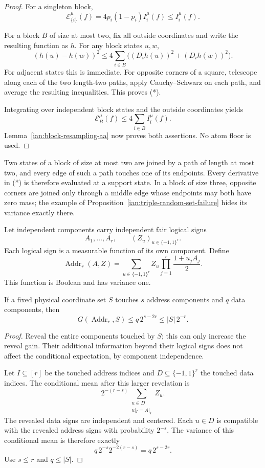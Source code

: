 \begin{proof}
For a singleton block,
\[
 \mathcal E_{\{i\}}^\mu(f)
 =4p_i(1-p_i)I_i^\mu(f)\le I_i^\mu(f).
\]

For a block \(B\) of size at most two, fix all outside coordinates
and write the resulting function as \(h\). For any block states
\(u,w\),
\[
 (h(u)-h(w))^2
 \le4\sum_{i\in B}
       \bigl((D_ih(u))^2+(D_ih(w))^2\bigr).
 \tag{*}
\]
For adjacent states this is immediate. For opposite corners of a
square, telescope along each of the two length-two paths, apply
Cauchy--Schwarz on each path, and average the resulting inequalities.
This proves (*).

Integrating over independent block states and the outside coordinates
yields
\[
 \mathcal E_B^\mu(f)\le4\sum_{i\in B}I_i^\mu(f).
\]
Lemma~\ref{ian:block-resampling-aa} now proves both assertions.
No atom floor is used.
\end{proof}

\begin{remark}
\label{ian:two-versus-three}
Two states of a block of size at most two are joined by a path of length at most two, and every edge of such a path touches one of its endpoints. Every derivative in (*) is therefore evaluated at a support state. In a block of size three, opposite corners are joined only through a middle edge whose endpoints may both have zero mass; the example of Proposition~\ref{ian:triple-random-set-failure} hides its variance exactly there.
\end{remark}

\begin{lemma}
\label{ian:addressing-reveal}
Let independent components carry independent fair logical signs
\[
 A_1,\ldots,A_r,\qquad (Z_u)_{u\in\{-1,1\}^r}.
\]
Each logical sign is a measurable function of its own component.
Define
\[
 \operatorname{Addr}_r(A,Z)
 =\sum_{u\in\{-1,1\}^r}
       Z_u\prod_{j=1}^r\frac{1+u_jA_j}{2}.
\]
This function is Boolean and has variance one.

If a fixed physical coordinate set \(S\) touches \(s\) address
components and \(q\) data components, then
\[
 G(\operatorname{Addr}_r,S)
 \le q\,2^{s-2r}
 \le |S|\,2^{-r}.
\]
\end{lemma}

\begin{proof}
Reveal the entire components touched by \(S\); this can only increase
the reveal gain. Their additional information beyond their logical
signs does not affect the conditional expectation, by component
independence.

Let \(I\subseteq[r]\) be the touched address indices and
\(D\subseteq\{-1,1\}^r\) the touched data indices. The conditional mean
after this larger revelation is
\[
 2^{-(r-s)}
 \sum_{\substack{u\in D\\u|_I=A|_I}}Z_u.
\]
The revealed data signs are independent and centered. Each
\(u\in D\) is compatible with the revealed address signs with
probability \(2^{-s}\). The variance of this conditional mean is
therefore exactly
\[
 q\,2^{-s}2^{-2(r-s)}=q\,2^{s-2r}.
\]
Use \(s\le r\) and \(q\le|S|\).
\end{proof}

